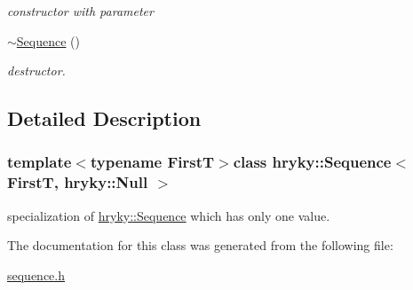 \begin{DoxyCompactItemize}
\begin{DoxyCompactList}\small\item\em constructor with parameter \end{DoxyCompactList}\item 
\hypertarget{classhryky_1_1_sequence_3_01_first_t_00_01hryky_1_1_null_01_4_a513cb75c7f1820fa373a21016d999511}{\hyperlink{classhryky_1_1_sequence_3_01_first_t_00_01hryky_1_1_null_01_4_a513cb75c7f1820fa373a21016d999511}{$\sim$\-Sequence} ()}\label{classhryky_1_1_sequence_3_01_first_t_00_01hryky_1_1_null_01_4_a513cb75c7f1820fa373a21016d999511}

\begin{DoxyCompactList}\small\item\em destructor. \end{DoxyCompactList}\end{DoxyCompactItemize}


\subsection{Detailed Description}
\subsubsection*{template$<$typename First\-T$>$class hryky\-::\-Sequence$<$ First\-T, hryky\-::\-Null $>$}

specialization of \hyperlink{classhryky_1_1_sequence}{hryky\-::\-Sequence} which has only one value. 

The documentation for this class was generated from the following file\-:\begin{DoxyCompactItemize}
\item 
\hyperlink{sequence_8h}{sequence.\-h}\end{DoxyCompactItemize}

